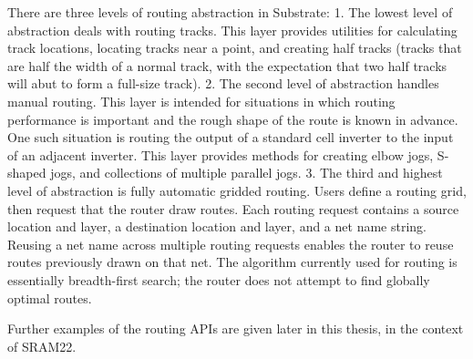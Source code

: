 There are three levels of routing abstraction in Substrate:
1. The lowest level of abstraction deals with routing tracks. This layer provides utilities for calculating
   track locations, locating tracks near a point, and creating half tracks
   (tracks that are half the width of a normal track, with the expectation that two half tracks will abut
   to form a full-size track).
2. The second level of abstraction handles manual routing. This layer is intended for situations in which
   routing performance is important and the rough shape of the route is known in advance. One such situation is
   routing the output of a standard cell inverter to the input of an adjacent inverter. This layer
   provides methods for creating elbow jogs, S-shaped jogs, and collections of multiple parallel jogs.
3. The third and highest level of abstraction is fully automatic gridded routing. Users define a routing grid,
   then request that the router draw routes. Each routing request contains a source location and layer,
   a destination location and layer, and a net name string. Reusing a net name across multiple routing requests
   enables the router to reuse routes previously drawn on that net. The algorithm currently used for routing
   is essentially breadth-first search; the router does not attempt to find globally optimal routes.

Further examples of the routing APIs are given later in this thesis, in the context of SRAM22.

